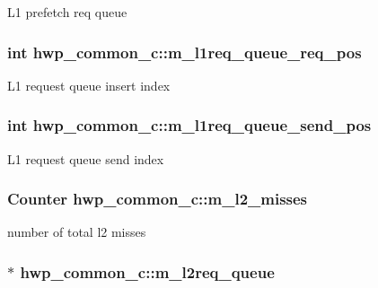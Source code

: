 \label{classhwp__common__c_a77746bacd00943b3f0b05c01cab47c08}
L1 prefetch req queue \hypertarget{classhwp__common__c_a4ff579785f41d6cd50b9f7d3dfb53eda}{
\subsubsection[{m\_\-l1req\_\-queue\_\-req\_\-pos}]{\setlength{\rightskip}{0pt plus 5cm}int {\bf hwp\_\-common\_\-c::m\_\-l1req\_\-queue\_\-req\_\-pos}}}
\label{classhwp__common__c_a4ff579785f41d6cd50b9f7d3dfb53eda}
L1 request queue insert index \hypertarget{classhwp__common__c_a8a2d2e563385b7af4694888f96902bdc}{
\subsubsection[{m\_\-l1req\_\-queue\_\-send\_\-pos}]{\setlength{\rightskip}{0pt plus 5cm}int {\bf hwp\_\-common\_\-c::m\_\-l1req\_\-queue\_\-send\_\-pos}}}
\label{classhwp__common__c_a8a2d2e563385b7af4694888f96902bdc}
L1 request queue send index \hypertarget{classhwp__common__c_a57e9422811b855c6de9a041c1f7d3045}{
\subsubsection[{m\_\-l2\_\-misses}]{\setlength{\rightskip}{0pt plus 5cm}Counter {\bf hwp\_\-common\_\-c::m\_\-l2\_\-misses}}}
\label{classhwp__common__c_a57e9422811b855c6de9a041c1f7d3045}
number of total l2 misses \hypertarget{classhwp__common__c_ade1174fd9f09001b7805398b7f18c03b}{
\subsubsection[{m\_\-l2req\_\-queue}]{$\ast$ {\bf hwp\_\-common\_\-c::m\_\-l2req\_\-queue}}}
